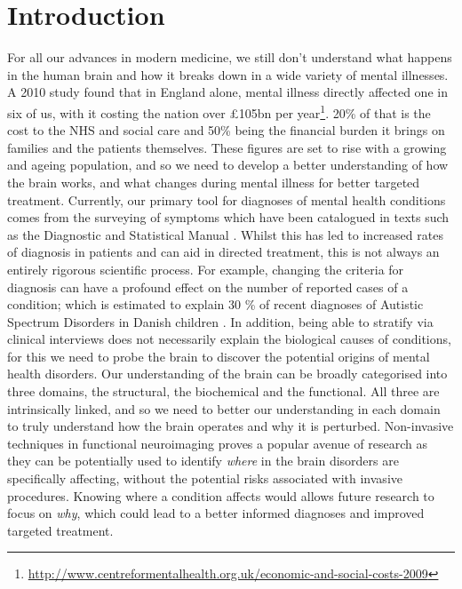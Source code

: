 \chapter{Introduction}\label{chap_intro}

For all our advances in modern medicine, we still don't understand what happens in the human brain and how it breaks down in a wide variety of mental illnesses. A 2010 study found that in England alone, mental illness directly affected one in six of us, with it costing the nation over £105bn per year\footnote{\url{http://www.centreformentalhealth.org.uk/economic-and-social-costs-2009}}. 20\% of that is the cost to the NHS and social care and 50\% being the financial burden it brings on families and the patients themselves. These figures are set to rise with a growing and ageing population, and so we need to develop a better understanding of how the brain works, and what changes during mental illness for better targeted treatment. Currently, our primary tool for diagnoses of mental health conditions comes from the surveying of symptoms which have been catalogued in texts such as the Diagnostic and Statistical Manual \citep{APA2013}. Whilst this has led to increased rates of diagnosis in patients and can aid in directed treatment, this is not always an entirely rigorous scientific process. For example, changing the criteria for diagnosis can have a profound effect on the number of reported cases of a condition; which is estimated to explain 30 \% of recent diagnoses of Autistic Spectrum Disorders in Danish children \citep{Hansen2015}. In addition, being able to stratify via clinical interviews does not necessarily explain the biological causes of conditions, for this we need to probe the brain to discover the potential origins of mental health disorders. Our understanding of the brain can be broadly categorised into three domains, the structural, the biochemical and the functional. All three are intrinsically linked, and so we need to better our understanding in each domain to truly understand how the brain operates and why it is perturbed. Non-invasive techniques in functional neuroimaging proves a popular avenue of research as they can be potentially used to identify \textit{where} in the brain disorders are specifically affecting, without the potential risks associated with invasive procedures. Knowing where a condition affects would allows future research to focus on \textit{why}, which could lead to a better informed diagnoses and improved targeted treatment. 

